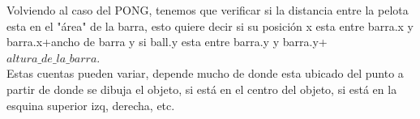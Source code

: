\documentclass[]{article}
\begin{document}
Volviendo al caso del PONG, tenemos que verificar si la distancia entre la pelota esta en el "\'area" de la barra, esto quiere decir si su posici\'on x esta entre barra.x y barra.x+ancho de barra y si ball.y esta entre barra.y y barra.y+$altura\_de\_la\_barra$.\\

Estas cuentas pueden variar, depende mucho de donde esta ubicado del punto a partir de donde se dibuja el objeto, si est\'a en el centro del objeto, si est\'a en la esquina superior izq, derecha, etc.
\end{document}
